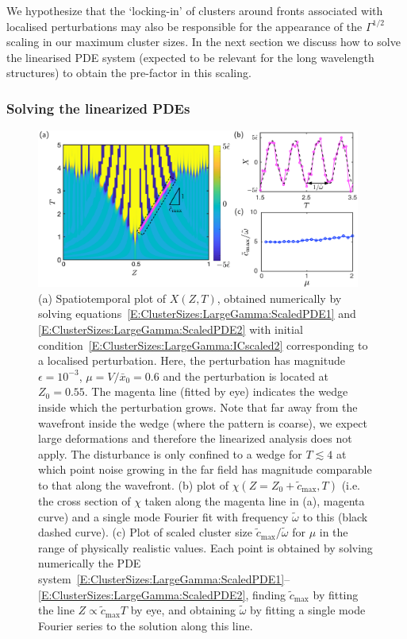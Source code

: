 We hypothesize that the `locking-in' of clusters around fronts associated with localised perturbations may also be responsible for the appearance of the $\Gamma^{1/2}$ scaling in our maximum cluster sizes. In the next section we discuss how to solve the linearised PDE system (expected to be relevant for the long wavelength structures) to obtain the pre-factor in this scaling.

 \subsubsection{Solving the linearized PDEs}
 \begin{figure}[t]
\centering
\includegraphics[width = 0.95\textwidth]{Redicretised_wedge_new}
\caption{(a) Spatiotemporal plot of $X(Z,T)$, obtained numerically by solving equations~\eqref{E:ClusterSizes:LargeGamma:ScaledPDE1} and \eqref{E:ClusterSizes:LargeGamma:ScaledPDE2} with initial condition~\eqref{E:ClusterSizes:LargeGamma:ICscaled2} corresponding to a localised perturbation. Here, the perturbation has magnitude $\epsilon = 10^{-3}$, $\mu =V/\bar{x}_0= 0.6$ and the perturbation is located at $Z_0 = 0.55$.  The magenta line (fitted by eye) indicates the wedge inside which the perturbation grows. Note that far away from the wavefront inside the wedge (where the pattern is coarse), we expect large deformations and therefore the linearized analysis does not apply. The disturbance is only confined to a wedge for  $T \lesssim 4$ at which point noise growing in the far field has magnitude comparable to that along the wavefront. (b) plot of $\chi(Z = Z_0 + \tilde{c}_{\max},T)$  (i.e. the cross section of $\chi$ taken along the magenta line in (a), magenta curve) and a single mode Fourier fit with frequency $\tilde{\omega}$ to this (black dashed curve). (c) Plot of scaled cluster size $\tilde{c}_{\max}/\tilde{\omega}$ for $\mu$ in the  range of physically realistic values. Each point is obtained by solving numerically the PDE system~\eqref{E:ClusterSizes:LargeGamma:ScaledPDE1}--\eqref{E:ClusterSizes:LargeGamma:ScaledPDE2}, finding $\tilde{c}_{\max}$ by fitting the line $Z \propto \tilde{c}_{\max} T$ by eye, and obtaining $\tilde{\omega}$ by fitting a single mode Fourier series to the solution along this line. }\label{fig:ClusterSizes:LargeGamma:RediscretisedWegde}
\end{figure}

